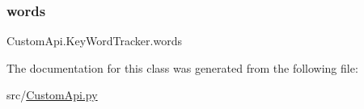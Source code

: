 \subsubsection{\texorpdfstring{words}{words}}
{\footnotesize\ttfamily Custom\+Api.\+Key\+Word\+Tracker.\+words}



The documentation for this class was generated from the following file\+:\begin{DoxyCompactItemize}
\item 
src/\mbox{\hyperlink{_custom_api_8py}{Custom\+Api.\+py}}\end{DoxyCompactItemize}
